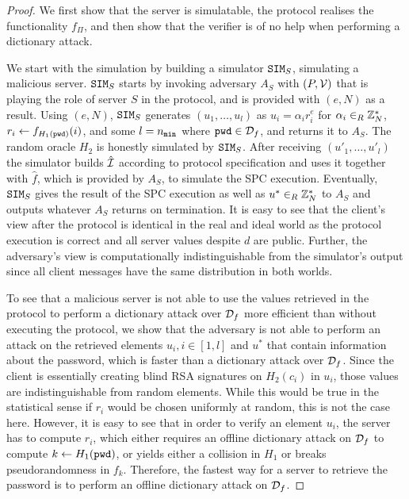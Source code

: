 \begin{proof}
  We first show that the server is simulatable, \ie the protocol realises the functionality $f_\Pi$, and then show that the verifier \ver is of no help when performing a dictionary attack.
  
  We start with the simulation by building a simulator $\mathtt{SIM}_S$, simulating a malicious server.
  $\mathtt{SIM}_S$ starts by invoking adversary $A_S$ with $(P, \mathcal{V})$ that is playing the role of server $S$ in the protocol, and is provided with $(e,N)$ as a result.
  Using $(e,N)$, $\mathtt{SIM}_S$ generates $(u_1, \dots, u_l)$ as $u_i=\alpha_i r_i^e$ for $\alpha_i\in_R \mathbb{Z}^\ast_N$, $r_i\gets f_{H_1(\mathtt{pwd})}(i)$, and some $l={n_\mathtt{min}}$ where $\mathtt{pwd}\in\mathcal{D}_f$, and returns it to $A_S$.
  The random oracle $H_2$ is honestly simulated by $\mathtt{SIM}_S$.
  After receiving $(u'_1, \dots, u'_l)$ the simulator builds $\hat{\mathcal{I}}$ according to protocol specification and uses it together with $\hat{f}$, which is provided by $A_S$, to simulate the \ac{SPC} execution.
  Eventually, $\mathtt{SIM}_S$ gives the result of the \ac{SPC} execution as well as $u^\ast\in_R\mathbb{Z}^\ast_N$ to $A_S$ and outputs whatever $A_S$ returns on termination.
  It is easy to see that the client's view after the protocol is identical in the real and ideal world as the protocol execution is correct and all server values despite $d$ are public.
  Further, the adversary's view is computationally indistinguishable from the simulator's output since all client messages have the same distribution in both worlds.
  
  To see that a malicious server is not able to use the values retrieved in the protocol to perform a dictionary attack over $\mathcal{D}_f$ more efficient than without executing the protocol, \ie we show that the adversary is not able to perform an attack on the retrieved elements $u_i, i\in[1,l]$ and $u^\ast$ that contain information about the password, which is faster than a dictionary attack over $\mathcal{D}_f$.
  Since the client is essentially creating blind RSA signatures on $H_2(c_i)$ in $u_i$, those values are indistinguishable from random elements.
  While this would be true in the statistical sense if $r_i$ would be chosen uniformly at random, this is not the case here.
  However, it is easy to see that in order to verify an element $u_i$, the server has to compute $r_i$, which either requires an offline dictionary attack on $\mathcal{D}_f$ to compute $k\gets H_1(\mathtt{pwd})$, or yields either a collision in $H_1$ or breaks pseudorandomness in $f_k$.
  Therefore, the fastest way for a server to retrieve the password is to perform an offline dictionary attack on $\mathcal{D}_f$.
  
\end{proof}

